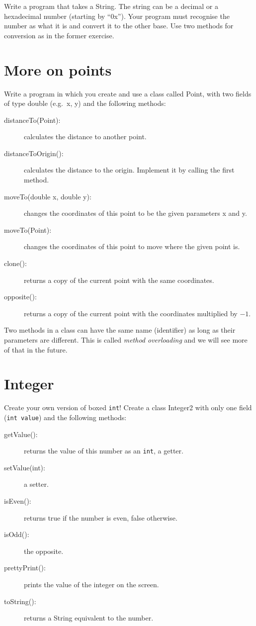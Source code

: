 \documentclass{article}
\begin{document}
Write a program that takes a String. The string can be a decimal or a
hexadecimal number (starting by ``0x''). Your program must recognise
the number as what it is and convert it to the other base. Use two
methods for conversion as in the former exercise. 

\section{More on points}
\label{sec:more-points}

Write a program in which you create and use a class called Point, 
with two fields of type double (e.g.~x, y) and the
following methods: 

\begin{description}
\item[distanceTo(Point): ] calculates the distance to another point.
\item[distanceToOrigin(): ] calculates the distance to the
  origin. Implement it by calling the first method.
\item[moveTo(double x, double y): ] changes the coordinates of this point to
  be the given parameters x and y. 
\item[moveTo(Point): ] changes the coordinates of this point to move
  where the given point is.
\item[clone(): ] returns a copy of the current point with the same
  coordinates.
\item[opposite(): ] returns a copy of the current point with the
  coordinates multiplied by $-1$. 
\end{description}

Two methods in a class can have the same name (identifier) as long as
their parameters are different. This is called \emph{method
  overloading} and we will see more of that in the future.

\section{Integer}
\label{sec:integer}

Create your own version of boxed \verb+int+! Create a class Integer2
with only one field (\verb+int value+) and the following methods: 

\begin{description}
\item[getValue(): ] returns the value of this number as an
  \verb+int+, a getter. 
\item[setValue(int): ] a setter.
\item[isEven(): ] returns true if the number is even, false
  otherwise.
\item[isOdd(): ] the opposite.
\item[prettyPrint(): ] prints the value of the integer on the screen.
\item[toString(): ] returns a String equivalent to the number. 
\end{description}
\end{document}
